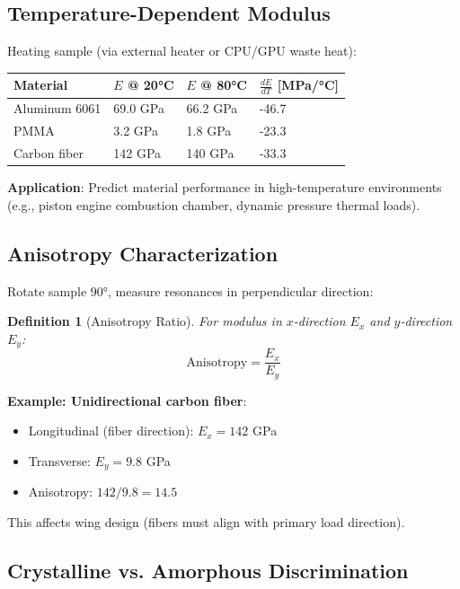 \documentclass[12pt,a4paper]{article}
\newtheorem{definition}{Definition}
\begin{document}
\subsection{Temperature-Dependent Modulus}

Heating sample (via external heater or CPU/GPU waste heat):

\begin{center}
\begin{tabular}{|l|l|l|l|}
\hline
\textbf{Material} & \textbf{$E$ @ 20°C} & \textbf{$E$ @ 80°C} & \textbf{$\frac{dE}{dT}$ [MPa/°C]} \\
\hline
Aluminum 6061 & 69.0 GPa & 66.2 GPa & -46.7 \\
PMMA & 3.2 GPa & 1.8 GPa & -23.3 \\
Carbon fiber & 142 GPa & 140 GPa & -33.3 \\
\hline
\end{tabular}
\end{center}

\textbf{Application}: Predict material performance in high-temperature environments (e.g., piston engine combustion chamber, dynamic pressure thermal loads).

\subsection{Anisotropy Characterization}

Rotate sample 90°, measure resonances in perpendicular direction:

\begin{definition}[Anisotropy Ratio]
For modulus in $x$-direction $E_x$ and $y$-direction $E_y$:
\begin{equation}
\text{Anisotropy} = \frac{E_x}{E_y}
\end{equation}
\end{definition}

\textbf{Example: Unidirectional carbon fiber}:
\begin{itemize}
\item Longitudinal (fiber direction): $E_x = 142$ GPa
\item Transverse: $E_y = 9.8$ GPa
\item Anisotropy: $142/9.8 = 14.5$
\end{itemize}

This affects wing design (fibers must align with primary load direction).

\subsection{Crystalline vs. Amorphous Discrimination}
\end{document}

